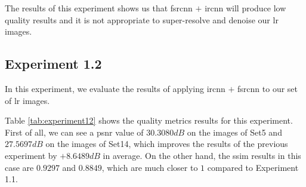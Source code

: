 The results of this experiment shows us that \gls{fsrcnn} $+$ \gls{ircnn} will produce low quality results and it is not appropriate to super-resolve and denoise our \gls{lr} images.

\subsection{Experiment 1.2}
In this experiment, we evaluate the results of applying \gls{ircnn} $+$ \gls{fsrcnn} to our set of \gls{lr} images.

Table \ref{tab:experiment12} shows the quality metrics results for this experiment. First of all, we can see a \gls{psnr} value of $30.3080dB$ on the images of Set5 and $27.5697dB$ on the images of Set14, which improves the results of the previous experiment by $+8.6489dB$ in average. On the other hand, the \gls{ssim} results in this case are $0.9297$ and $0.8849$, which are much closer to $1$ compared to Experiment 1.1.

